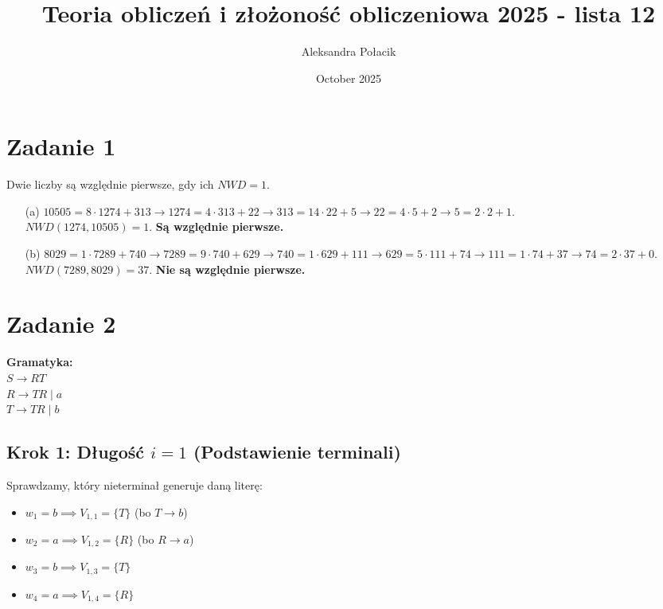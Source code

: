 \documentclass{article}
\title{Teoria obliczeń i złożoność obliczeniowa 2025 - lista 12}
\author{Aleksandra Połacik}
\date{October 2025}
\begin{document}
\maketitle

\section{Zadanie 1}
Dwie liczby są względnie pierwsze, gdy ich $NWD = 1$.
\begin{itemize}
    \item[(a)] $10505 = 8 \cdot 1274 + 313 \rightarrow 1274 = 4 \cdot 313 + 22 \rightarrow 313 = 14 \cdot 22 + 5 \rightarrow 22 = 4 \cdot 5 + 2 \rightarrow 5 = 2 \cdot 2 + 1$. \\
    $NWD(1274, 10505) = 1$. \textbf{Są względnie pierwsze.}
    \item[(b)] $8029 = 1 \cdot 7289 + 740 \rightarrow 7289 = 9 \cdot 740 + 629 \rightarrow 740 = 1 \cdot 629 + 111 \rightarrow 629 = 5 \cdot 111 + 74 \rightarrow 111 = 1 \cdot 74 + 37 \rightarrow 74 = 2 \cdot 37 + 0$. \\
    $NWD(7289, 8029) = 37$. \textbf{Nie są względnie pierwsze.}
\end{itemize}

\section{Zadanie 2}

\textbf{Gramatyka:} \\
$S \to RT$ \\
$R \to TR \mid a$ \\
$T \to TR \mid b$

\subsection*{Krok 1: Długość $i=1$ (Podstawienie terminali)}
Sprawdzamy, który nieterminał generuje daną literę:
\begin{itemize}
    \item $w_1 = b \implies V_{1,1} = \{T\}$ (bo $T \to b$)
    \item $w_2 = a \implies V_{1,2} = \{R\}$ (bo $R \to a$)
    \item $w_3 = b \implies V_{1,3} = \{T\}$
    \item $w_4 = a \implies V_{1,4} = \{R\}$
\end{itemize}
\end{document}
